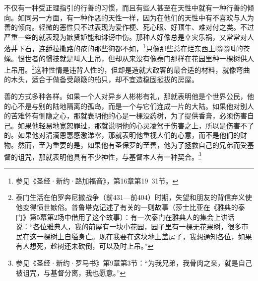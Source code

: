 \par 不仅有一种受正理指引的行善的习惯，而且有些人甚至在天性中就有一种行善的倾向。如同另一方面，有一种作恶的天性一样，因为在他们的天性中有不喜欢与人为善的倾向。轻微的恶性只不过表现为爱作梗、死心眼、好顶牛、难对付之类。不过严重一些的就表现为嫉贤妒能和诽谤中伤。那种人好像总是幸灾乐祸，又常常对人落井下石，连舔拉撒路的疮的那些狗都不如，\footnote{参见《圣经·新约·路加福音》，第16章第19~31节。}只像那些总在烂东西上嗡嗡叫的苍蝇。恨世者的惯技就是叫人上吊，但却从来没有像泰门那样在花园里种一棵树供人上吊用。\footnote{泰门生活在伯罗奔尼撒战争（前431—前404）时期，失望和朋友的背信弃义使他变得愤世嫉俗。普鲁塔克记述了有关的一则故事（莎士比亚在《雅典的泰门》第5幕第2场中借用了这个故事）：有一次泰门在雅典人的集会上讲话说：“各位雅典人，我的前屋有一块小花园，园子里有一棵无花果树，很多市民在这一棵树上自缢身亡。现在我要在这块地上盖房子，我想通知各位，如果有人想死，趁树还未砍倒，可以及时上吊。”}这种性情是违背人性的，但却是造就大政客的最合适的材料，就像弯曲的木头，适合于做备受颠簸的船只，却不宜造稳固挺拔的房屋。
\par 善的方式多种各样。如果一个人对异乡人彬彬有礼，那就表明他是个世界公民，他的心不是与别的陆地隔离的孤岛，而是一个与它们连成一片的大陆。如果他对别人的苦难怀有恻隐之心，那就表明他的心是一棵没药树，为了提供香膏，必须伤害自己。如果他轻易地宽恕罪过，那就说明他的心灵凌驾于伤害之上，所以是伤害不了的。如果他对涓滴恩惠感激涕零，那就表明他重视人们的心意，而不是他们的财物。然而，至为重要的是，如果他有圣保罗的至善，他为了拯救自己的兄弟而受基督的诅咒，那就表明他具有不少神性，与基督本人有一种契合。\footnote{参见《圣经·新约·罗马书》第9章第3节：“为我兄弟，我骨肉之亲，就是自己被诅咒，与基督分离，我也愿意。”}



